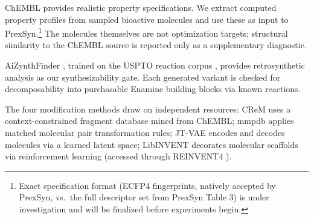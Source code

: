 ChEMBL \cite{bib4} provides realistic property specifications. We extract computed property profiles from sampled bioactive molecules and use these as input to PrexSyn.\footnote{Exact specification format (ECFP4 fingerprints, natively accepted by PrexSyn, vs.\ the full descriptor set from PrexSyn Table 3) is under investigation and will be finalized before experiments begin.} The molecules themselves are not optimization targets; structural similarity to the ChEMBL source is reported only as a supplementary diagnostic.

AiZynthFinder \cite{bib5}, trained on the USPTO reaction corpus \cite{bib6}, provides retrosynthetic analysis as our synthesizability gate. Each generated variant is checked for decomposability into purchasable Enamine building blocks via known reactions.

The four modification methods draw on independent resources: CReM \cite{bib7} uses a context-constrained fragment database mined from ChEMBL; mmpdb \cite{bib8} applies matched molecular pair transformation rules; JT-VAE \cite{bib9} encodes and decodes molecules via a learned latent space; LibINVENT \cite{bib10} decorates molecular scaffolds via reinforcement learning (accessed through REINVENT4 \cite{bib11}).
